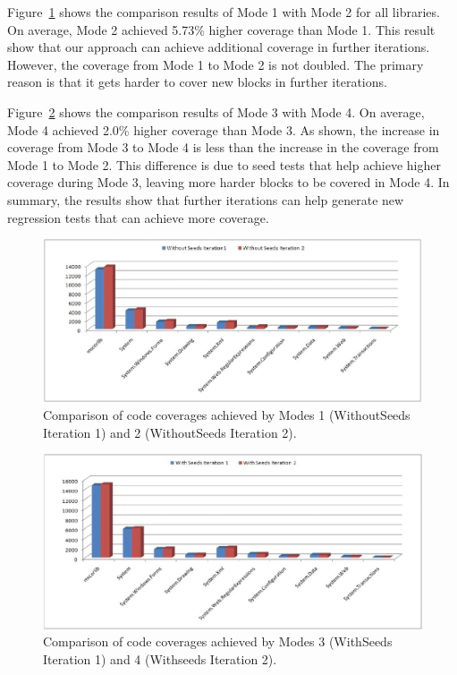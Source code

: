 Figure~\ref{fig:rq41} shows the comparison results of Mode 1 with Mode 2 for all libraries. 
On average, Mode 2 achieved 5.73\% higher coverage than Mode 1. This result show
that our approach can achieve additional coverage in further iterations. However,
the coverage from Mode 1 to Mode 2 is not doubled. 
The primary reason is that it gets harder to cover new blocks in further iterations.

Figure~\ref{fig:rq42} shows the comparison results of Mode 3 with Mode 4. On average, 
Mode 4 achieved 2.0\% higher coverage than Mode 3. As shown, the increase in
coverage from Mode 3 to Mode 4 is less than the increase in the coverage from Mode 1
to Mode 2. This difference is due to seed tests that help achieve higher coverage
during Mode 3, leaving more harder blocks to be covered in Mode 4. In summary,
the results show that further iterations can help generate new regression
tests that can achieve more coverage.

\begin{figure}[t]
\centering
\includegraphics[scale=0.70,clip]{figs/RQ4_1_1.eps}\vspace*{-1ex}
\caption{\label{fig:rq41}Comparison of code coverages achieved by Modes 1 (WithoutSeeds Iteration 1) and 2 (WithoutSeeds Iteration 2).} 
\end{figure}


\begin{figure}[t]
\centering
\includegraphics[scale=0.70,clip]{figs/RQ4_2_1.eps}\vspace*{-1ex}
\caption{\label{fig:rq42}Comparison of code coverages achieved by Modes 3 (WithSeeds Iteration 1) and 4 (Withseeds Iteration 2).}
\end{figure}

